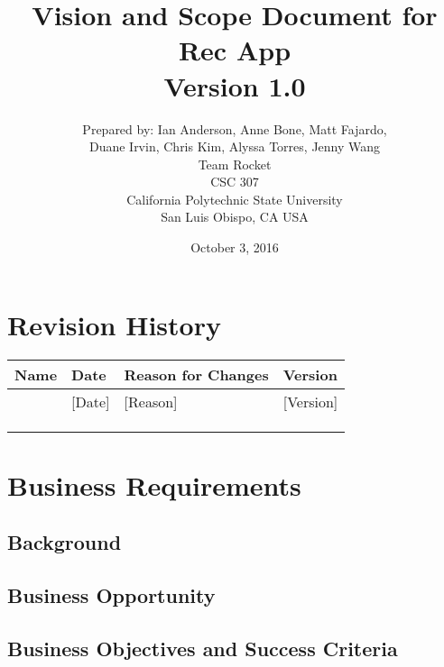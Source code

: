 \documentclass[12pt]{article}
\begin{document}
\title{Vision and Scope Document for Rec App\\Version 1.0}
\author {
Prepared by: Ian Anderson, Anne Bone, Matt Fajardo,\\
Duane Irvin, Chris Kim, Alyssa Torres, Jenny Wang\\
Team Rocket\\
CSC 307\\
California Polytechnic State University\\
San Luis Obispo, CA USA\\
}
\date{October 3, 2016}
\maketitle
\hfill
\newpage

\tableofcontents


\section*{Revision History}
\begin{tabular}{|l|l|p{2.5in}|l|}
\hline
\textbf{Name}&\textbf{Date}&\textbf{Reason for Changes}&\textbf{Version}\\
\hline
[Name]&[Date]&[Reason]&[Version]\\
\hline
&&&\\
\hline
&&&\\
\hline
&&&\\
\hline
\end{tabular}

\newpage


\section{Business Requirements}

\subsection{Background}

\subsection{Business Opportunity}

\subsection{Business Objectives and Success Criteria}
\end{document}
